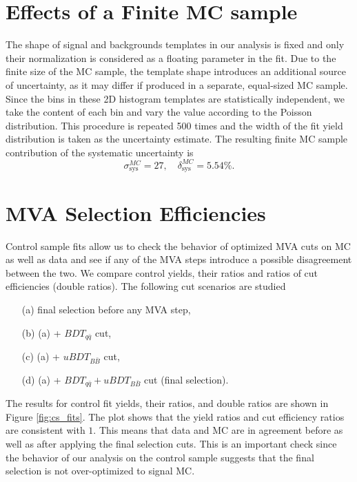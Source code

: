 \section{Effects of a Finite MC sample}
The shape of signal and backgrounds templates in our analysis is fixed and only their normalization is considered as a floating parameter in the fit. Due to the finite size of the MC sample, the template shape introduces an additional source of uncertainty, as it may differ if produced in a separate, equal-sized MC sample. Since the bins in these 2D histogram templates are statistically independent, we take the content of each bin and vary the value according to the Poisson distribution. This procedure is repeated 500 times and the width of the fit yield distribution is taken as the uncertainty estimate. The resulting finite MC sample contribution of the systematic uncertainty is
\begin{equation}
\sigma_{\mathrm{sys}}^{MC} = 27,\quad \delta_{\mathrm{sys}}^{MC} = 5.54\%.
\end{equation}


\section{MVA Selection Efficiencies}
Control sample fits allow us to check the behavior of optimized MVA cuts on MC as well as data and see if any of the MVA steps introduce a possible disagreement between the two. We compare control yields, their ratios and ratios of cut efficiencies (double ratios). The following cut scenarios are studied
\begin{itemize}
	\item[(a)] final selection before any MVA step,
	\item[(b)] (a) + $BDT_{q\bar q}$ cut,
	\item[(c)] (a) + $uBDT_{B\bar B}$ cut,
	\item[(d)] (a) + $BDT_{q\bar q} + uBDT_{B\bar B}$ cut (final selection).
\end{itemize}

The results for control fit yields, their ratios, and double ratios are shown in Figure \ref{fig:cs_fits}. The plot shows that the yield ratios and cut efficiency ratios are consistent with $1$. This means that data and MC are in agreement before as well as after applying the final selection cuts. This is an important check since the behavior of our analysis on the control sample suggests that the final selection is not over-optimized to signal MC.

